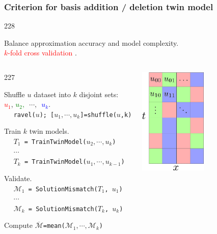 \documentclass{beamer}
\let\oldcite=\cite
\renewcommand{\cite}[1]{\textcolor[rgb]{.4,.4,.85}{\oldcite{#1}}}
\newcommand{\barrow}{\item[\color{darkred}\ding{228}]}
\newcommand{\carrow}{\item[\color{darkred}\ding{227}]}
\begin{document}
\begin{frame}
    \frametitle{Criterion for basis addition / deletion \hfill \scriptsize{twin model}}\small
    \begin{dinglist}{228}
        \barrow Balance approximation accuracy and model complexity. \\
                \textcolor{red}{$k$-fold cross validation} 
                \scriptsize \cite{Geisser 93} \small.\\
    \end{dinglist}
    \vspace{-.2cm}
            \begin{columns}
                \begin{dinglist}{227}
                    \carrow Shuffle $u$ dataset into $k$ disjoint sets:\\ \textcolor{red}{$u_1$}, 
                            \textcolor{green}{$u_2,$} $\,\cdots, \, $ 
                            \textcolor{blue}{$u_k$}.\\
                    $\quad$ \texttt{ravel($u$); [$u_1, \cdots, u_k$]=shuffle($u$,k)}
                    \vspace{.1cm}
                    \carrow Train $k$ twin models.\\
                    $\quad$ \texttt{$T_1$ = TrainTwinModel($u_2, \cdots, u_k$)}\\
                    $\quad$ $\cdots$\\
                    $\quad$ \texttt{$T_k$ = TrainTwinModel($u_1, \cdots, u_{k-1}$)}
                    \vspace{.1cm}
                    \carrow Validate.\\
                    $\quad$ \texttt{$\mathcal{M}_1$ = SolutionMismatch($T_1$, $u_1$)}\\
                    $\quad$ $\cdots$\\
                    $\quad$ \texttt{$\mathcal{M}_k$ = SolutionMismatch($T_k$, $u_k$)}\\
                    \vspace{.1cm}
                    \carrow Compute \texttt{$\overline{\mathcal{M}}$=mean($\mathcal{M}_1, \cdots, 
                            \mathcal{M}_k$)}
                \end{dinglist}
                \begin{center}
                    \includegraphics[width=3.2cm]{shuffle_1.png}

\end{center}
\end{columns}
\end{frame}
\end{document}
